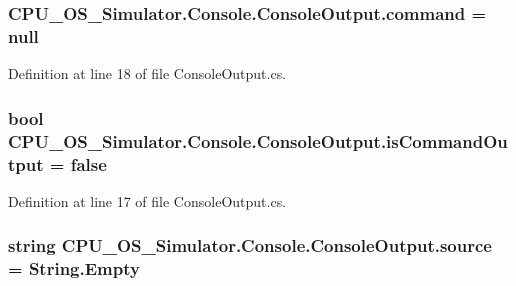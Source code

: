 \subsubsection[{command}]{ C\+P\+U\+\_\+\+O\+S\+\_\+\+Simulator.\+Console.\+Console\+Output.\+command = null\hspace{0.3cm}{\ttfamily [private]}}\label{class_c_p_u___o_s___simulator_1_1_console_1_1_console_output_aef6097d68fb3e2e83043c3857fdb8d56}


Definition at line 18 of file Console\+Output.\+cs.

\hypertarget{class_c_p_u___o_s___simulator_1_1_console_1_1_console_output_a916cf1368a1974e808ce0f77e850bc98}{}
\subsubsection[{is\+Command\+Output}]{\setlength{\rightskip}{0pt plus 5cm}bool C\+P\+U\+\_\+\+O\+S\+\_\+\+Simulator.\+Console.\+Console\+Output.\+is\+Command\+Output = false\hspace{0.3cm}{\ttfamily [private]}}\label{class_c_p_u___o_s___simulator_1_1_console_1_1_console_output_a916cf1368a1974e808ce0f77e850bc98}


Definition at line 17 of file Console\+Output.\+cs.

\hypertarget{class_c_p_u___o_s___simulator_1_1_console_1_1_console_output_a3873d00cdb36068d1108fb012857504a}{}
\subsubsection[{source}]{\setlength{\rightskip}{0pt plus 5cm}string C\+P\+U\+\_\+\+O\+S\+\_\+\+Simulator.\+Console.\+Console\+Output.\+source = String.\+Empty\hspace{0.3cm}{\ttfamily [private]}}\label{class_c_p_u___o_s___simulator_1_1_console_1_1_console_output_a3873d00cdb36068d1108fb012857504a}


